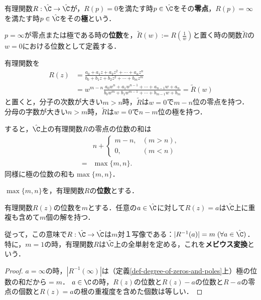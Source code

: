 \documentclass[uplatex, dvipdfmx]{jsreport}
\begin{document}
\begin{definition}\label{def-degree-of-zeros-and-poles}
    有理関数$R:\hat{\C}\to\hat{\C}$が，$R(p)=0$を満たす時$p\in\hat{\C}$をその\textbf{零点}，$R(p)=\infty$を満たす時$p\in\hat{\C}$をその\textbf{極}という．

    $p=\infty$が零点または極である時の\textbf{位数}を，$\tilde{R}(w):=R(\frac{1}{w})$と置く時の関数$\tilde{R}$の$w=0$における位数として定義する．
\end{definition}
\begin{discussion}
    有理関数を
    \begin{align*}
        R(z)&=\frac{a_0+a_1z+a_2z^2+\cdots+a_nz^n}{b_0+b_1z+b_2z^2+\cdots+b_mz^m}\\
        &=w^{m-n}\frac{a_0w^n+a_1w^{n-1}+\cdots+a_{n-1}w+a_n}{b_0w^m+b_1w^{m-1}+\cdots+b_{m-1}w+b_m}=\tilde{R}(w)
    \end{align*}
    と置くと，分子の次数が大きい$m>n$時，$\tilde{R}$は$w=0$で$m-n$位の零点を持つ．
    分母の字数が大きい$n>m$時，$\tilde{R}$は$w=0$で$n-m$位の極を持つ．

    すると，$\hat{\C}$上の有理関数$R$の零点の位数の和は
    \begin{align*}
        &n+\begin{cases}
            m-n,&(m>n),\\
            0,&(m<n)
        \end{cases}\\
        =&\max\{m,n\}.
    \end{align*}
    同様に極の位数の和も$\max\{m,n\}$．
\end{discussion}

\begin{definition}
    $\max\{m,n\}$を，有理関数$R$の\textbf{位数}とする．
\end{definition}

\begin{theorem}[有理関数の根の個数と全単射になる条件]\label{thm-1-degree-meromorphism-is-bijective}
    有理関数$R(z)$の位数を$m$とする．任意の$a\in\hat{\C}$に対して$R(z)=a$は$\hat{\C}$上に重複も含めて$m$個の解を持つ．
    
    従って，この意味で$R:\hat{\C}\to\hat{\C}$は$m$対１写像である：$|R^{-1}(a)|=m\;(\forall a\in\hat{\C})$．
    特に，$m=1$の時，有理関数$R$は$\hat{\C}$上の全単射を定める，これを\textbf{メビウス変換}という．
\end{theorem}
\begin{proof}
    $a=\infty$の時，$|R^{-1}(\infty)|$は（定義\ref{def-degree-of-zeros-and-poles}上）極の位数の和だから$=m$．
    $a\in\C$の時，$R(z)$の位数と$R(z)-a$の位数と$R-a$の零点の個数と$R(z)=a$の根の重複度を含めた個数は等しい．
\end{proof}
\end{document}
